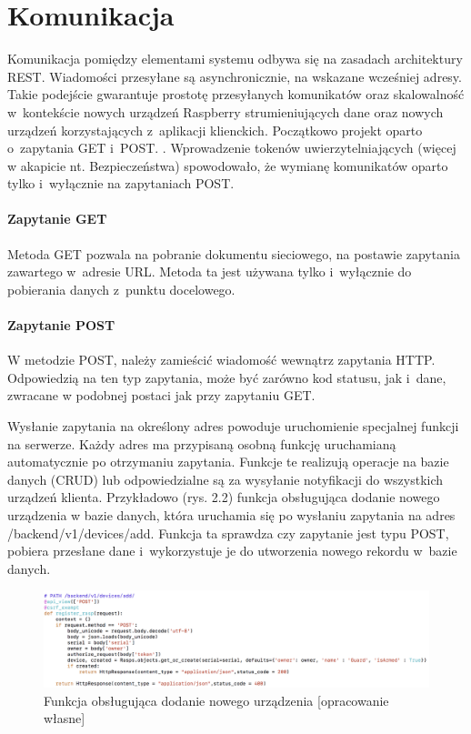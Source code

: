 \section{Komunikacja}

Komunikacja pomiędzy elementami systemu odbywa się na zasadach architektury REST. Wiadomości przesyłane są asynchronicznie, na wskazane wcześniej adresy.
Takie podejście gwarantuje prostotę przesyłanych komunikatów oraz skalowalność w~kontekście nowych urządzeń Raspberry strumieniujących dane oraz nowych urządzeń korzystających z~aplikacji klienckich. Początkowo projekt oparto o~zapytania GET i~POST.  \cite{WEBARCH}. Wprowadzenie tokenów uwierzytelniających (więcej w akapicie nt. Bezpieczeństwa) spowodowało, że wymianę komunikatów oparto tylko i~wyłącznie na zapytaniach POST. 

\paragraph{Zapytanie GET}
Metoda GET pozwala na pobranie dokumentu sieciowego, na postawie zapytania zawartego w~adresie URL. Metoda ta jest używana tylko i~wyłącznie do pobierania danych z~punktu docelowego. 

\paragraph{Zapytanie POST}
W metodzie POST, należy zamieścić wiadomość wewnątrz zapytania HTTP. Odpowiedzią na ten typ zapytania, może być zarówno kod statusu, jak i~dane, zwracane w podobnej postaci jak przy zapytaniu GET.

Wysłanie zapytania na określony adres powoduje uruchomienie specjalnej funkcji na serwerze. Każdy adres ma przypisaną osobną funkcję uruchamianą automatycznie po otrzymaniu zapytania. Funkcje te realizują operacje na bazie danych (CRUD) lub odpowiedzialne są za wysyłanie notyfikacji do wszystkich urządzeń klienta. Przykładowo (rys. 2.2) funkcja obsługująca dodanie nowego urządzenia w bazie danych, która uruchamia się po wysłaniu zapytania na adres /backend/v1/devices/add. Funkcja ta sprawdza czy zapytanie jest typu POST, pobiera przesłane dane i~wykorzystuje je do utworzenia nowego rekordu w~bazie danych.
\begin{figure}[ht] 
   \centering
   \includegraphics[width=14cm]{backend.png} 
   \caption{Funkcja obsługująca dodanie nowego urządzenia [opracowanie własne]}
\end{figure}


